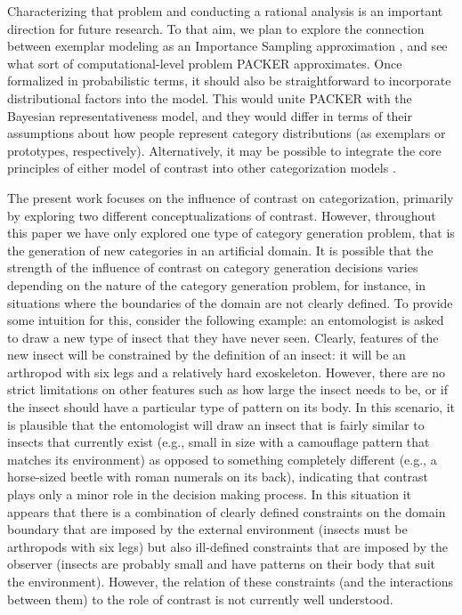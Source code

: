 \documentclass[pdflatex,sn-apa]{sn-jnl}%
\theoremstyle{thmstyleone}%
\theoremstyle{thmstyletwo}%
\theoremstyle{thmstylethree}%
\begin{document}
Characterizing that problem and conducting a rational analysis is an important
direction for future research. To that aim, we plan to explore the connection
between exemplar modeling as an Importance Sampling approximation
\citep{shi10exemplar}, and see what sort of computational-level problem PACKER
approximates. Once formalized in probabilistic terms, it should also be
straightforward to incorporate distributional factors into the model. This would
unite PACKER with the Bayesian representativeness model, and they would differ
in terms of their assumptions about how people represent category distributions
(as exemplars or prototypes, respectively). Alternatively, it may be possible to
integrate the core principles of either model of contrast into other
categorization models
\citep[e.g.,][]{love2004sustain,kurtz2007divergent,smith2000thirty}.

The present work focuses on the influence of contrast on categorization,
primarily by exploring two different conceptualizations of contrast. However,
throughout this paper we have only explored one type of category generation
problem, that is the generation of new categories in an
artificial domain. It is possible that the strength of the influence of contrast on
category generation decisions varies depending on the nature of the category
generation problem, for instance, in situations where the boundaries of the
domain are not clearly defined. To provide some intuition for this, consider the
following example: an entomologist is asked to draw a new type of insect that
they have never seen. Clearly, features of the new insect will be constrained by
the definition of an insect: it will be an arthropod with six legs and a
relatively hard exoskeleton. However, there are no strict limitations on other
features such as how large the insect needs to be, or if the insect should have
a particular type of pattern on its body. In this scenario, it is plausible that
the entomologist will draw an insect that is fairly similar to insects that
currently exist (e.g., small in size with a camouflage pattern that matches its
environment) as opposed to something completely different (e.g., a horse-sized
beetle with roman numerals on its back), indicating that contrast plays only a
minor role in the decision making process. In this situation it appears that
there is a combination of clearly defined constraints on the domain boundary
that are imposed by the external environment (insects must be arthropods with
six legs) but also ill-defined constraints that are imposed by the observer
(insects are probably small and have patterns on their body that suit the
environment). However, the relation of these constraints (and the interactions
between them) to the role of contrast is not currently well understood.
\end{document}
